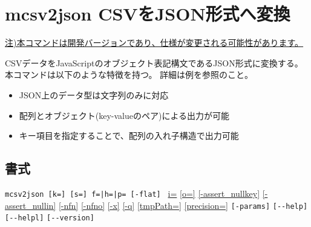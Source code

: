 
%

\section{mcsv2json CSVをJSON形式へ変換\label{sect:mcsv2json}}
\underline{注)本コマンドは開発バージョンであり、仕様が変更される可能性があります。}

CSVデータをJavaScriptのオブジェクト表記構文であるJSON形式に変換する。
本コマンドは以下のような特徴を持つ。
詳細は例を参照のこと。

\begin{itemize}
 \item JSON上のデータ型は文字列のみに対応
 \item 配列とオブジェクト(key-valueのペア)による出力が可能
 \item キー項目を指定することで、配列の入れ子構造で出力可能
\end{itemize}

\subsection*{書式}
\verb/mcsv2json [k=] [s=] f=|h=|p= [-flat] /
\hyperref[sect:option_i]{i=}
\hyperref[sect:option_o]{[o=]}
\hyperref[sect:option_assert_nullkey]{[-assert\_nullkey]}
\hyperref[sect:option_assert_nullin]{[-assert\_nullin]}
\hyperref[sect:option_nfn]{[-nfn]}
\hyperref[sect:option_nfno]{[-nfno]}
\hyperref[sect:option_x]{[-x]}
\hyperref[sect:option_q]{[-q]}
\hyperref[sect:option_option_tmppath]{[tmpPath=]}
\hyperref[sect:option_precision]{[precision=]}
\verb|[-params]|
\verb|[--help]|
\verb|[--helpl]|
\verb|[--version]|\\

